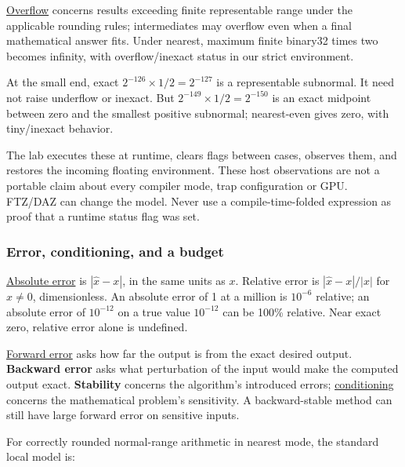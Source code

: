 \hypertarget{01-foundations-i-ch001-range-events-are-observable-but-not-interchangeable}{}

\hyperref[appendix-ed8531b46754]{Overflow} concerns results exceeding finite representable range under the applicable rounding rules; intermediates may overflow even when a final mathematical answer fits. Under nearest, maximum finite binary32 times two becomes infinity, with overflow/inexact status in our strict environment.

At the small end, exact \(2^{-126}\times1/2=2^{-127}\) is a representable subnormal. It need not raise underflow or inexact. But \(2^{-149}\times1/2=2^{-150}\) is an exact midpoint between zero and the smallest positive subnormal; nearest-even gives zero, with tiny/inexact behavior.

The lab executes these at runtime, clears flags between cases, observes them, and restores the incoming floating environment. These host observations are not a portable claim about every compiler mode, trap configuration or GPU. FTZ/DAZ can change the model. Never use a compile-time-folded expression as proof that a runtime status flag was set.

\subsubsection{Error, conditioning, and a budget}\label{01-foundations-i-ch001-error-conditioning-and-a-budget}

\hypertarget{01-foundations-i-ch001-error-conditioning-and-a-budget}{}

\hyperref[appendix-3ae74e89b4e6]{Absolute error} is \(|\widehat x-x|\), in the same units as \(x\). Relative error is \(|\widehat x-x|/|x|\) for \(x\ne0\), dimensionless. An absolute error of 1 at a million is \(10^{-6}\) relative; an absolute error of \(10^{-12}\) on a true value \(10^{-12}\) can be 100\% relative. Near exact zero, relative error alone is undefined.

\hyperref[appendix-a7fbaf6d1b1c]{Forward error} asks how far the output is from the exact desired output. \textbf{Backward error} asks what perturbation of the input would make the computed output exact. \textbf{Stability} concerns the algorithm's introduced errors; \hyperref[appendix-8f6a01f284a7]{conditioning} concerns the mathematical problem's sensitivity. A backward-stable method can still have large forward error on sensitive inputs.

For correctly rounded normal-range arithmetic in nearest mode, the standard local model is:

